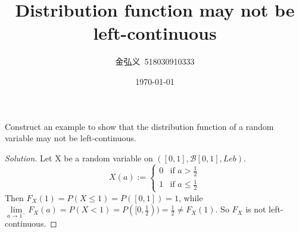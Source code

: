 \documentclass[a4paper, linespread=1.5]{article}
\begin{document}
	\title{Distribution function may not be left-continuous}
	\author{金弘义\ 518030910333}
	\date{\today}
	\maketitle
	
	\begin{customex}{1}
		
	Construct an example to show that the distribution function of a random variable may not be left-continuous.
	\end{customex}
	\begin{proof}[Solution]
	Let X be a random variable on $([0,1],\mathcal{B}[0,1],Leb)$. 
	\begin{equation}
	X(a):=
	\begin{cases}
	0& \mbox{if $a>\frac{1}{2}$}\\
	1& \mbox{if $a\le\frac{1}{2}$}
	\end{cases}
	\end{equation}
	Then  $F_X(1)=P(X\le 1)=P([0,1])=1$, while $\lim\limits_{a\to1^{-}}F_X(a)=P(X<1)=P([0,\frac{1}{2}))=\frac{1}{2}\ne F_X(1)$. So $F_X$ is not left-continuous.
	\end{proof}
	
	
	
	
\end{document}
